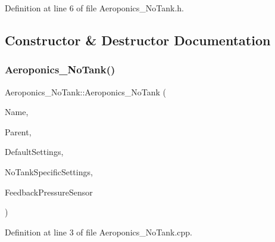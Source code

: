 Definition at line 6 of file Aeroponics\+\_\+\+No\+Tank.\+h.



\subsection{Constructor \& Destructor Documentation}
\mbox{\label{class_aeroponics___no_tank_aa46529f5e83970d7579a7d524ea65ab7}} 
\subsubsection{\texorpdfstring{Aeroponics\+\_\+\+No\+Tank()}{Aeroponics\_NoTank()}\hspace{0.1cm}{\footnotesize\ttfamily [1/2]}}
{\footnotesize\ttfamily Aeroponics\+\_\+\+No\+Tank\+::\+Aeroponics\+\_\+\+No\+Tank (\begin{DoxyParamCaption}\item[{const \+\_\+\+\_\+\+Flash\+String\+Helper $\ast$}]{Name,  }\item[{\hyperlink{class_module}{Module} $\ast$}]{Parent,  }\item[{\hyperlink{struct_settings_1_1_aeroponics_settings}{Settings\+::\+Aeroponics\+Settings} $\ast$}]{Default\+Settings,  }\item[{\hyperlink{struct_settings_1_1_aeroponics_settings___no_tank_specific}{Settings\+::\+Aeroponics\+Settings\+\_\+\+No\+Tank\+Specific} $\ast$}]{No\+Tank\+Specific\+Settings,  }\item[{\hyperlink{class_pressure_sensor}{Pressure\+Sensor} $\ast$}]{Feedback\+Pressure\+Sensor }\end{DoxyParamCaption})}



Definition at line 3 of file Aeroponics\+\_\+\+No\+Tank.\+cpp.

